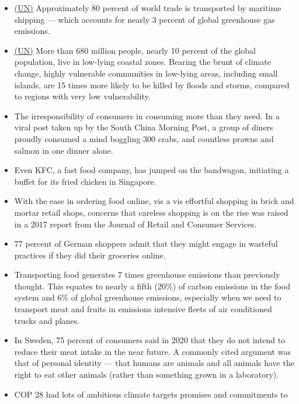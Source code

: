 \documentclass[oneside]{book}
\begin{document}
\begin{enumerate}
\begin{itemize}
            \item \href{https://www.un.org/en/climatechange/science/climate-issues/ocean}{(UN)} Approximately 80 percent of world trade is transported by maritime shipping --- which accounts for nearly 3 percent of global greenhouse gas emissions. 
            \item \href{https://www.un.org/en/climatechange/science/climate-issues/ocean}{(UN)} More than 680 million people, nearly 10 percent of the global population, live in low-lying coastal zones. Bearing the brunt of climate change, highly vulnerable communities in low-lying areas, including small islands, are 15 times more likely to be killed by floods and storms, compared to regions with very low vulnerability.
            \item The irresponsibility of consumers in consuming more than they need. In a viral post taken up by the South China Morning Post, a group of diners proudly consumed a mind boggling 300 crabs, and countless prawns and salmon in one dinner alone.
            \item Even KFC, a fast food company, has jumped on the bandwagon, initiating a buffet for its fried chicken in Singapore.
            \item With the ease in ordering food online, vis a vis effortful shopping in brick and mortar retail shops, concerns that careless shopping is on the rise was raised in a 2017 report from the Journal of Retail and Consumer Services.
            \item 77 percent of German shoppers admit that they might engage in wasteful practices if they did their groceries online.
            \item Transporting food generates 7 times greenhouse emissions than previously
            thought. This equates to nearly a fifth (20\%) of carbon emissions in the food system and 6\% of global greenhouse emissions, especially when we need to transport meat and fruits in emissions intensive fleets of air conditioned trucks and planes.
            \item In Sweden, 75 percent of consumers said in 2020 that they do
            not intend to reduce their meat intake in the near future. A commonly cited argument was
            that of personal identity --- that humans are animals and all animals have the right to eat
            other animals (rather than something grown in a laboratory).
            \item COP 28 had lots of ambitious climate
            targets promises and commitments to

\end{itemize}
\end{enumerate}
\end{document}
